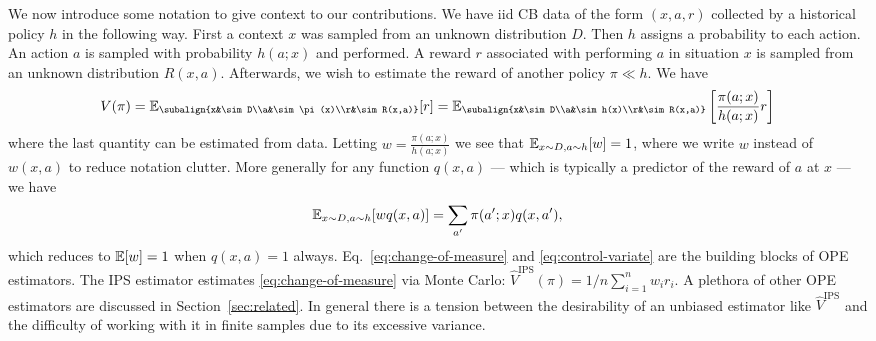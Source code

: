 We now introduce some notation to give context to our contributions.  We have
iid CB data of the form $(x,a,r)$ collected by a historical
policy $h$ in the following way. First a context $x$ was sampled from an unknown
distribution $D$.  Then $h$ assigns a probability to each action.  An action
$a$ is sampled with probability $h(a;x)$ and performed. A reward $r$ associated
with performing $a$ in situation $x$ is sampled from an unknown distribution
$R(x,a)$.  Afterwards, we wish to estimate the reward of another policy $\pi \ll h$. We have
\begin{equation}
\label{eq:change-of-measure}
V(\pi) = \E_{\subalign{x&\sim D\\a&\sim\pi(x)\\r&\sim R(x,a)}}[r]
=
\E_{\subalign{x&\sim D\\a&\sim h(x)\\r&\sim R(x,a)}}\left[\frac{\pi(a;x)}{h(a;x)}r\right]
\end{equation}
where the last quantity can be estimated from data.
%
Letting $w=\frac{\pi(a;x)}{h(a;x)}$  we see that 
$\mathbb{E}_{x\sim D,a\sim h}[w]=1$, where we write $w$ instead of $w(x,a)$ to reduce notation clutter. More generally
for any function $q(x,a)$ --- which is typically a predictor of the reward of $a$ at $x$ --- we have
\begin{equation}
\label{eq:control-variate}
\mathbb{E}_{x\sim D,a\sim h}[w q(x,a)] = \sum_{a'} \pi(a';x) q(x,a'),    
\end{equation}
which reduces to $\mathbb{E}[w]=1$ when $q(x,a)=1$ always.
Eq.~\eqref{eq:change-of-measure} and \eqref{eq:control-variate} are the
building blocks of OPE estimators.  The IPS estimator \cite{HT52} estimates
\eqref{eq:change-of-measure} via Monte Carlo: $\hat{V}^{\textrm{IPS}}(\pi) =
1/n \sum_{i=1}^n w_i r_i $.  A plethora of other OPE estimators are discussed
in Section~\ref{sec:related}. In general there is a tension between the
desirability of an unbiased estimator like $\hat V^{\textrm{IPS}}$ and the
difficulty of working with it in finite samples due to its excessive
variance.

